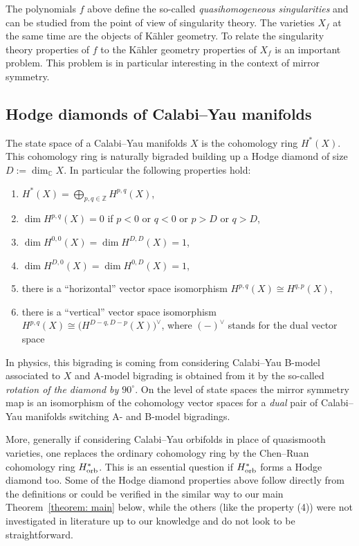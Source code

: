 \documentclass[pdftex]{sigma}
\numberwithin{equation}{section}
\newcommand{\CC}{{\mathbb{C}}}
\newcommand{\ZZ}{{\mathbb{Z}}}
\begin{document}
The polynomials $f$ above define the so-called \textit{quasihomogeneous singularities} and can be studied from the point of view of singularity theory. The varieties $X_f$ at the same time are the objects of K\"ahler geometry. To relate the singularity theory properties of $f$ to the K\"ahler geometry properties of $X_f$ is an important problem. This problem is in particular interesting in the context of mirror symmetry.

\subsection{Hodge diamonds of Calabi--Yau manifolds}

The state space of a Calabi--Yau manifolds $X$ is the cohomology ring $H^\ast(X)$.
This cohomology ring is naturally bigraded building up a Hodge diamond of size $D := \dim_\CC X$. In particular the following properties hold:
\begin{enumerate}\itemsep=0pt
 \item[(1)] $H^\ast(X) = \bigoplus_{p,q \in \ZZ} H^{p,q}(X)$,
 \item[(2)] $\dim H^{p,q}(X) = 0$ if $p <0$ or $q <0$ or $p > D$ or $q > D$,
 \item[(3)] $\dim H^{0,0}(X) = \dim H^{D,D}(X) = 1$,
 \item[(4)] $\dim H^{D,0}(X) = \dim H^{0,D}(X) = 1$,
 \item[(5)] there is a ``horizontal'' vector space isomorphism $H^{p,q}(X) \cong H^{q,p}(X)$,
 \item[(6)] there is a ``vertical'' vector space isomorphism $H^{p,q}(X) \cong \bigl(H^{D-q,D-p}(X)\bigr)^\vee$, where $(-)^\vee$ stands for the dual vector space
\end{enumerate}

In physics, this bigrading is coming from considering Calabi--Yau B-model associated to $X$ and A-model bigrading is obtained from it by the so-called {\itshape rotation of the diamond by $90^\circ$}.
On the level of state spaces the mirror symmetry map is an isomorphism of the cohomology vector spaces for a {\itshape dual} pair of Calabi--Yau manifolds switching A- and B-model bigradings.

More, generally if considering Calabi--Yau orbifolds in place of quasismooth varieties, one replaces the ordinary cohomology ring by the Chen--Ruan cohomology ring $H^\ast_{\rm orb}$.
This is an essential question if $H^\ast_{\rm orb}$ forms a Hodge diamond too. Some of the Hodge diamond properties above follow directly from the definitions or could be verified in the similar way to our main Theorem~\ref{theorem: main} below, while the others (like the property (4)) were not investigated in literature up to our knowledge and do not look to be straightforward.
\end{document}
